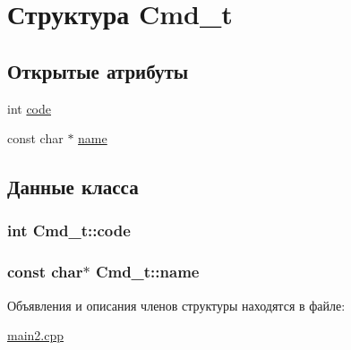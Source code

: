 \hypertarget{struct_cmd__t}{
\section{Структура Cmd\_\-t}
\label{struct_cmd__t}
}
\subsection*{Открытые атрибуты}
\begin{DoxyCompactItemize}
\item 
int \hyperlink{struct_cmd__t_af317cedb3cf0242f7e0294506fe2786b}{code}
\item 
const char $\ast$ \hyperlink{struct_cmd__t_a8bd9fa2a318cd0f9aa1b5938b306e069}{name}
\end{DoxyCompactItemize}


\subsection{Данные класса}
\hypertarget{struct_cmd__t_af317cedb3cf0242f7e0294506fe2786b}{
\subsubsection[{code}]{\setlength{\rightskip}{0pt plus 5cm}int {\bf Cmd\_\-t::code}}}
\label{struct_cmd__t_af317cedb3cf0242f7e0294506fe2786b}
\hypertarget{struct_cmd__t_a8bd9fa2a318cd0f9aa1b5938b306e069}{
\subsubsection[{name}]{\setlength{\rightskip}{0pt plus 5cm}const char$\ast$ {\bf Cmd\_\-t::name}}}
\label{struct_cmd__t_a8bd9fa2a318cd0f9aa1b5938b306e069}


Объявления и описания членов структуры находятся в файле:\begin{DoxyCompactItemize}
\item 
\hyperlink{main2_8cpp}{main2.cpp}\end{DoxyCompactItemize}
